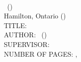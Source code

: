 \documentclass[
11pt, %
oneside, %
english, %
singlespacing, %
]{macthesis} %
\def\blankpage{%
      \clearpage%
      \thispagestyle{empty}%
      \addtocounter{page}{-1}%
      \null%
      \clearpage}
\begin{document}


\blankpage
\clearpage


\newpage
{} %
\setcounter{page}{2} %

\noindent %
\univname \\
\degreename\, (\the\year) \\
Hamilton, Ontario (\deptname) \\[1.5cm]
TITLE: \ttitle \\
AUTHOR: \authorname\,  %
(\univname)  \\
SUPERVISOR: \supname\, \\
NUMBER OF PAGES: \pageref{lastoffront}, \pageref{LastPage}  %

\clearpage

\end{document}
